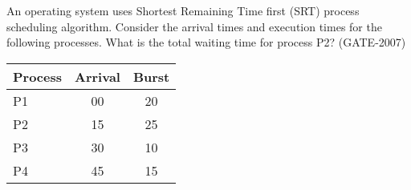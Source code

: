 
\begin{questyle}

  \question An operating system uses Shortest Remaining Time first (SRT) process scheduling algorithm.
            Consider the arrival times and execution times for the following processes.
            What is the total waiting time for process P2? (GATE-2007)

  \begin{myTableStyle}
    \begin{center}
    \begin{tabular}{ |l|c|c| } \hline
        Process &   Arrival & Burst    \\ \hline
        P1      &   00       & 20         \\ \hline
        P2      &   15       & 25         \\ \hline
        P3      &   30       & 10         \\ \hline
        P4      &   45       & 15         \\ \hline

    \end{tabular}
    \end{center}
  \end{myTableStyle}
  \vspace{0.08in}

  \begin{oneparchoices}
  \end{oneparchoices}

  \end{questyle}


